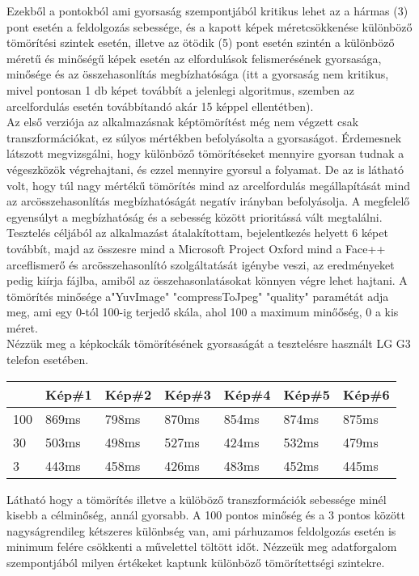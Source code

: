 Ezekből a pontokból ami gyorsaság szempontjából kritikus lehet az a hármas (3) pont esetén a feldolgozás sebessége, és a kapott képek méretcsökkenése különböző tömörítési szintek esetén, illetve az ötödik (5) pont esetén szintén a különböző méretű és minőségű képek esetén az elfordulások felismerésének gyorsasága, minősége és az összehasonlítás megbízhatósága (itt a gyorsaság nem kritikus, mivel pontosan 1 db képet továbbít a jelenlegi algoritmus, szemben az arcelfordulás esetén továbbítandó akár 15 képpel ellentétben).
\\Az első verziója az alkalmazásnak képtömörítést még nem végzett csak transzformációkat, ez súlyos mértékben befolyásolta a gyorsaságot. Érdemesnek látszott megvizsgálni, hogy különböző tömörítéseket mennyire gyorsan tudnak a végeszközök végrehajtani, és ezzel mennyire gyorsul a folyamat. De az is látható volt, hogy túl nagy mértékű tömörítés mind az arcelfordulás megállapítását mind az arcösszehasonlítás megbízhatóságát negatív irányban befolyásolja. A megfelelő egyensúlyt a megbízhatóság és a sebesség között prioritássá vált megtalálni.
\\
Tesztelés céljából az alkalmazást átalakítottam, bejelentkezés helyett 6 képet továbbít, majd az összesre mind a Microsoft Project Oxford mind a Face++ arceflismerő és arcösszehasonlító szolgáltatását igénybe veszi, az eredményeket pedig kiírja fájlba, amiből az összehasonlatásokat könnyen végre lehet hajtani. A tömörítés minősége a"YuvImage" "compressToJpeg" "quality" paramétát adja meg, ami egy 0-tól 100-ig terjedő skála, ahol 100 a maximum minőőség, 0 a kis méret.
\\Nézzük meg a képkockák tömörítésének gyorsaságát a tesztelésre használt LG G3 telefon esetében.

\begin{center}
	\begin{tabular}{|p{1cm}|p{} |p{} | p{}|p{}|p{}|p{}|}
   	\hline
	 & Kép\#1 & Kép\#2& Kép\#3&Kép\#4 &Kép\#5 &Kép\#6\\ \hline
	100 & 869ms & 798ms & 870ms & 854ms & 874ms & 875ms \\ \hline
	30 & 503ms & 498ms & 527ms & 424ms & 532ms & 479ms \\ \hline
	3 & 443ms & 458ms & 426ms & 483ms & 452ms & 445ms\\ \hline
	\end{tabular}
\end{center}

Látható hogy a tömörítés illetve a külöböző transzformációk sebessége minél kisebb a célminőség, annál gyorsabb. A 100 pontos minőség és a 3 pontos között nagyságrendileg kétszeres különbség van, ami párhuzamos feldolgozás esetén is minimum felére csökkenti a művelettel töltött időt. Nézzeük meg adatforgalom szempontjából milyen értékeket kaptunk különböző tömörítettségi szintekre.


